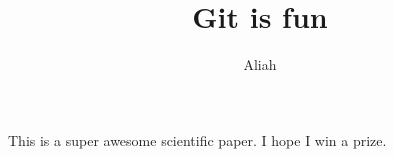 \documentclass[10pt]{article}
\author{Aliah}
\title{Git is fun}
\begin{document}
	\maketitle

	This is a super awesome scientific paper.
	I hope I win a prize.
\end{document}

